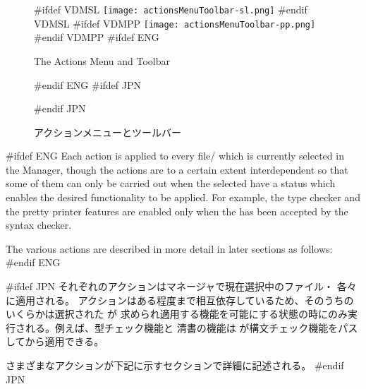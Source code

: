 \documentclass[\pformat,12pt]{article}
\newcommand{\guicmd}[1]{{\sf #1}}
\newcommand{\guicmd}[1]{{\gt #1}}
\begin{document}
\begin{figure}[tbh]
\begin{center}
\mbox{}
#ifdef VDMSL
\texttt{[image: actionsMenuToolbar-sl.png]}
#endif VDMSL
#ifdef VDMPP
\texttt{[image: actionsMenuToolbar-pp.png]}
#endif VDMPP
#ifdef ENG
\caption{The Actions Menu and Toolbar}
#endif ENG
#ifdef JPN
\caption{アクションメニューとツールバー}
#endif JPN
\label{fig:actionsMenuToolbar}
\end{center}
\end{figure}

#ifdef ENG
Each action is applied to every
file/ which is currently
selected in the \guicmd{Manager}, though the actions are to a certain
extent interdependent so that some of them can only be carried out 
 when the selected  have
 a status which enables the desired functionality to be applied. For
 example, the type checker and the pretty printer features are 
enabled only when the  has
been accepted by the syntax checker.

The various actions are described in more detail in later sections as follows:
#endif ENG

#ifdef JPN
それぞれのアクションはマネージャで現在選択中のファイル・
 各々に適用される。
アクションはある程度まで相互依存しているため、そのうちのいくらかは選択された
  が
求められ適用する機能を可能にする状態の時にのみ実行される。例えば、型チェック機能と
清書の機能は
 が構文チェック機能をパスしてから適用できる。

さまざまなアクションが下記に示すセクションで詳細に記述される。
#endif JPN
\end{document}
